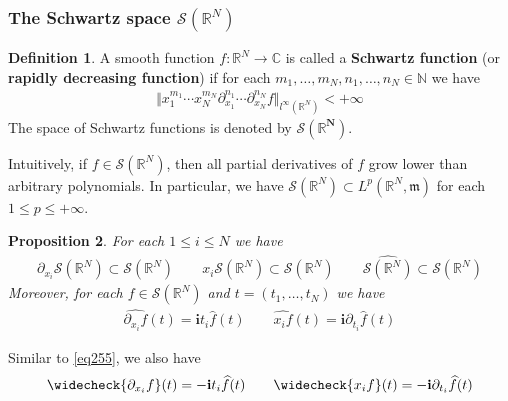 \documentclass[12pt,b5paper,notitlepage]{article}
\theoremstyle{definition}
\newtheorem{df}{Definition}[subsection]
\theoremstyle{plain}
\newtheorem{pp}[df]{Proposition}
\newcommand{\wht}{\widehat}
\newcommand{\wch}{\widecheck}
\newcommand{\im}{\mathbf{i}}
\newcommand{\Cbb}{\mathbb C}
\newcommand{\Nbb}{\mathbb N}
\newcommand{\Rbb}{\mathbb R}
\newcommand{\mk}{\mathfrak m}
\newcommand{\MS}{\mathcal S}
\numberwithin{equation}{section}
\begin{document}
\subsubsection{The Schwartz space $\MS(\Rbb^N)$}



\begin{df}\label{lb543}
A smooth function $f:\Rbb^N\rightarrow\Cbb$ is called a \textbf{Schwartz function}  (or \textbf{rapidly decreasing function})  if for each $m_1,\dots,m_N,n_1,\dots,n_N\in\Nbb$ we have
\begin{align*}
\big\Vert x_1^{m_1}\cdots x_N^{m_N}\partial_{x_1}^{n_1}\cdots \partial_{x_N}^{n_N}f\big\Vert_{l^\infty(\Rbb^N)}<+\infty
\end{align*}
The space of Schwartz functions is denoted by $\pmb{\MS(\Rbb^N)}$. \index{SR@$\MS(\Rbb^N)$}
\end{df}

Intuitively, if $f\in\MS(\Rbb^N)$, then all partial derivatives of $f$ grow lower than arbitrary polynomials. In particular, we have $\MS(\Rbb^N)\subset L^p(\Rbb^N,\mk)$ for each $1\leq p\leq+\infty$.

\begin{pp}\label{lb546}
For each $1\leq i\leq N$ we have
\begin{align*}
\partial_{x_i}\MS(\Rbb^N)\subset\MS(\Rbb^N)\qquad x_i\MS(\Rbb^N)\subset\MS(\Rbb^N)\qquad \wht{\MS(\Rbb^N)}\subset\MS(\Rbb^N)
\end{align*}
Moreover, for each $f\in\MS(\Rbb^N)$ and $t=(t_1,\dots,t_N)$ we have
\begin{align}\label{eq255}
\wht{\partial_{x_i}f}(t)=\im t_i \wht f(t)\qquad \wht{x_if}(t)=\im\partial_{t_i}\wht f(t)
\end{align}
\end{pp}

Similar to \eqref{eq255}, we also have
\begin{align*}
\wch{\partial_{x_i}f}(t)=-\im t_i \wht f(t)\qquad \wch{x_if}(t)=-\im\partial_{t_i}\wht f(t)
\end{align*}
\end{document}

